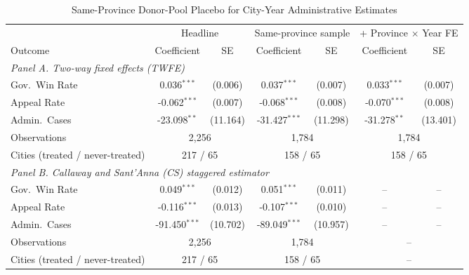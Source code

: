 \begin{table}[!htbp]
\setlength{\abovecaptionskip}{0pt}
\centering
\caption{Same-Province Donor-Pool Placebo for City-Year Administrative Estimates}
\label{tab:admin_within_province_appendix}
\begin{threeparttable}
\begin{tabular}{lcccccc}
\toprule
 & \multicolumn{2}{c}{Headline} & \multicolumn{2}{c}{Same-province sample} & \multicolumn{2}{c}{+ Province $\times$ Year FE} \\
\cmidrule(lr){2-3}\cmidrule(lr){4-5}\cmidrule(lr){6-7}
Outcome & Coefficient & SE & Coefficient & SE & Coefficient & SE \\
\midrule
\multicolumn{7}{l}{\textit{Panel A. Two-way fixed effects (TWFE)}} \\
\addlinespace
Gov.\ Win Rate & 0.036$^{***}$ & (0.006) & 0.037$^{***}$ & (0.007) & 0.033$^{***}$ & (0.007) \\
Appeal Rate & -0.062$^{***}$ & (0.007) & -0.068$^{***}$ & (0.008) & -0.070$^{***}$ & (0.008) \\
Admin.\ Cases & -23.098$^{**}$ & (11.164) & -31.427$^{***}$ & (11.298) & -31.278$^{**}$ & (13.401) \\
\addlinespace
Observations & \multicolumn{2}{c}{2,256} & \multicolumn{2}{c}{1,784} & \multicolumn{2}{c}{1,784} \\
Cities (treated / never-treated) & \multicolumn{2}{c}{217 / 65} & \multicolumn{2}{c}{158 / 65} & \multicolumn{2}{c}{158 / 65} \\
\midrule
\multicolumn{7}{l}{\textit{Panel B. Callaway and Sant'Anna (CS) staggered estimator}} \\
\addlinespace
Gov.\ Win Rate & 0.049$^{***}$ & (0.012) & 0.051$^{***}$ & (0.011) & -- & -- \\
Appeal Rate & -0.116$^{***}$ & (0.013) & -0.107$^{***}$ & (0.010) & -- & -- \\
Admin.\ Cases & -91.450$^{***}$ & (10.702) & -89.049$^{***}$ & (10.957) & -- & -- \\
\addlinespace
Observations & \multicolumn{2}{c}{2,256} & \multicolumn{2}{c}{1,784} & \multicolumn{2}{c}{--} \\
Cities (treated / never-treated) & \multicolumn{2}{c}{217 / 65} & \multicolumn{2}{c}{158 / 65} & \multicolumn{2}{c}{--} \\
\bottomrule
\end{tabular}
\begin{tablenotes}[flushleft]
\footnotesize

\end{tablenotes}
\end{threeparttable}
\end{table}
